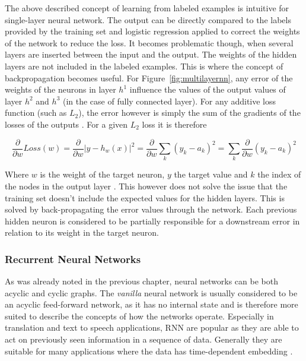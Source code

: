 The above described concept of learning from labeled examples is intuitive for single-layer neural network. The output can be
directly compared to the labels provided by the training set and logistic regression applied to correct the weights of
the network to reduce the loss. It becomes problematic though, when several layers are inserted between the input and
the output. The weights of the hidden layers are not included in the labeled examples. This is where the concept of
backpropagation becomes useful. For Figure~\ref{fig:multilayernn}, any error of the weights of the neurons in
layer $h^1$ influence the values of the output values of layer $h^2$ and $h^3$ (in the case of fully connected layer).
For any additive loss function (such as $L_2$), the error however is simply the sum of the gradients of the losses of
the outputs \cite[p.733f.]{russell2016artificial}. For a given $L_2$ loss it is therefore

\begin{equation}
    \frac{\partial}{\partial w} Loss(w) =  \frac{\partial}{\partial w} \vert y-h_w(x) \vert ^2 = \frac{\partial}{\partial w} \sum_k{(y_k - a_k)^2} =  \sum_k{\frac{\partial}{\partial w}(y_k - a_k)^2}
    \label{equ:errorssum}
\end{equation}

Where $w$ is the weight of the target neuron, $y$ the target value and $k$ the index of the nodes in the output layer \cite[p.733f.]{russell2016artificial}. This however does not
solve the issue that the training set doesn't include the expected values for the hidden layers. This is solved by
back-propagating the error values through the network. Each previous hidden neuron is considered to be partially
responsible for a downstream error in relation to its weight in the target neuron. 

\subsubsection{Recurrent Neural Networks}%
\label{sec:recurrent_neural_networks}

As was already noted in the previous chapter, neural networks can be both acyclic and cyclic graphs. The
\emph{vanilla} neural network is usually considered to be an acyclic feed-forward network, as it has no internal state and is
therefore more suited to describe the concepts of how the networks operate. Especially in translation and text to speech
applications, \ac{RNN} are popular as they are able to act on previously seen information in a sequence of
data. Generally they are suitable for many applications where the data has time-dependent embedding
\cite[p.373]{Goodfellow-et-al-2016}.

